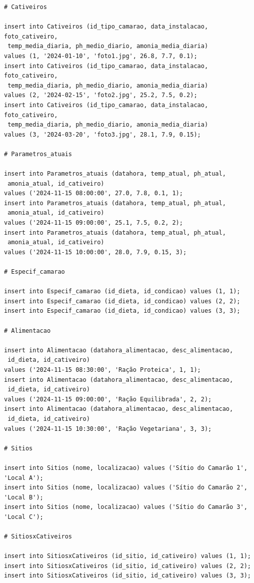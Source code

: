 \documentclass[
  a4paper,
  12pt,
  english,
  brazilian,
]{article}
\begin{document}
\begin{verbatim}
# Cativeiros

insert into Cativeiros (id_tipo_camarao, data_instalacao, foto_cativeiro,
 temp_media_diaria, ph_medio_diario, amonia_media_diaria) 
values (1, '2024-01-10', 'foto1.jpg', 26.8, 7.7, 0.1);
insert into Cativeiros (id_tipo_camarao, data_instalacao, foto_cativeiro,
 temp_media_diaria, ph_medio_diario, amonia_media_diaria) 
values (2, '2024-02-15', 'foto2.jpg', 25.2, 7.5, 0.2);
insert into Cativeiros (id_tipo_camarao, data_instalacao, foto_cativeiro,
 temp_media_diaria, ph_medio_diario, amonia_media_diaria) 
values (3, '2024-03-20', 'foto3.jpg', 28.1, 7.9, 0.15);

# Parametros_atuais

insert into Parametros_atuais (datahora, temp_atual, ph_atual,
 amonia_atual, id_cativeiro) 
values ('2024-11-15 08:00:00', 27.0, 7.8, 0.1, 1);
insert into Parametros_atuais (datahora, temp_atual, ph_atual,
 amonia_atual, id_cativeiro) 
values ('2024-11-15 09:00:00', 25.1, 7.5, 0.2, 2);
insert into Parametros_atuais (datahora, temp_atual, ph_atual,
 amonia_atual, id_cativeiro) 
values ('2024-11-15 10:00:00', 28.0, 7.9, 0.15, 3);

# Especif_camarao

insert into Especif_camarao (id_dieta, id_condicao) values (1, 1);
insert into Especif_camarao (id_dieta, id_condicao) values (2, 2);
insert into Especif_camarao (id_dieta, id_condicao) values (3, 3);

# Alimentacao

insert into Alimentacao (datahora_alimentacao, desc_alimentacao,
 id_dieta, id_cativeiro) 
values ('2024-11-15 08:30:00', 'Ração Proteica', 1, 1);
insert into Alimentacao (datahora_alimentacao, desc_alimentacao,
 id_dieta, id_cativeiro) 
values ('2024-11-15 09:00:00', 'Ração Equilibrada', 2, 2);
insert into Alimentacao (datahora_alimentacao, desc_alimentacao,
 id_dieta, id_cativeiro) 
values ('2024-11-15 10:30:00', 'Ração Vegetariana', 3, 3);

# Sitios

insert into Sitios (nome, localizacao) values ('Sítio do Camarão 1', 'Local A');
insert into Sitios (nome, localizacao) values ('Sítio do Camarão 2', 'Local B');
insert into Sitios (nome, localizacao) values ('Sítio do Camarão 3', 'Local C');

# SitiosxCativeiros

insert into SitiosxCativeiros (id_sitio, id_cativeiro) values (1, 1);
insert into SitiosxCativeiros (id_sitio, id_cativeiro) values (2, 2);
insert into SitiosxCativeiros (id_sitio, id_cativeiro) values (3, 3);


\end{verbatim}
\end{document}
